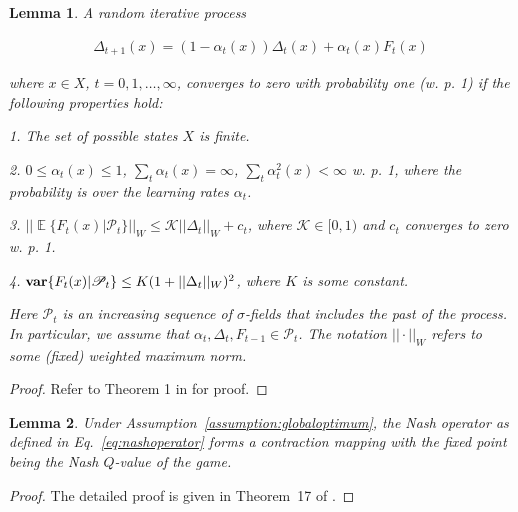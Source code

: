 \documentclass[jair, twoside,11pt,theapa]{article}
\DeclareMathOperator{\E}{\mathbb{E}}
\newtheorem{lemm2}{Lemma}
\begin{document}
\begin{lemm2}

A random iterative process 

\begin{equation*}
\begin{array}{l}
     \Delta_{t+1}(x) = (1 - \alpha_t(x))\Delta_t(x) + \alpha_t(x) F_t(x)
\end{array}{}
\end{equation*}

\noindent where $x \in X$, $t = 0,1, \ldots, \infty$, converges to zero with probability one (w. p. 1) if the following properties hold: 
 
1. The set of possible states $X$ is finite. 

2. $0 \leq \alpha_t(x) \leq 1$, $\sum_t \alpha_t(x) = \infty$, $\sum_t \alpha^2_t(x) < \infty$ w. p. 1, where the probability is over the learning rates $\alpha_t$. 

3. $|| \E \{{F_t(x)|\mathscr{P}_t}\} ||_W \leq \mathscr{K} ||\Delta_t||_W + c_t$, where $\mathscr{K} \in [0,1)$ and $c_t$ converges to zero w. p. 1. 

4. $\textrm{\textbf{var}}\{F_t(x) | \mathscr{P}_t\} \leq K(1 + ||\Delta_t||_W)^2$, where $K$ is some constant. 

\noindent Here $\mathscr{P}_t$ is an increasing sequence of $\sigma$-fields that includes the past of the process. In particular, we assume that $\alpha_t, \Delta_t, F_{t-1} \in \mathscr{P}_t$. The notation $||\cdot||_W$ refers to some (fixed) weighted maximum norm. 
 
 
\end{lemm2}


\begin{proof}

Refer to Theorem 1 in \citet{jaakkola1994convergence} for proof. 

\end{proof}

\begin{lemm2}
Under Assumption~\ref{assumption:globaloptimum}, the Nash operator as defined in Eq.~\ref{eq:nashoperator} forms a contraction mapping with the fixed point being the Nash $Q$-value of the game. 

\end{lemm2}

\begin{proof}
The detailed proof is given in Theorem~17 of \citet{hu2003nash}. 
\end{proof}
\end{document}
